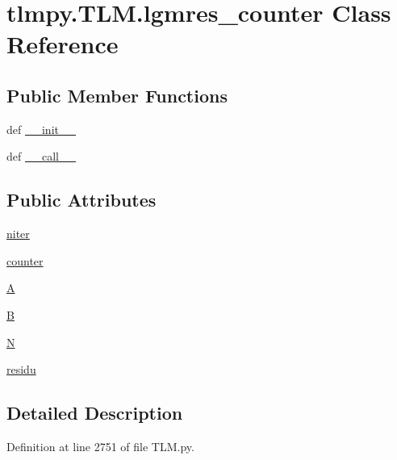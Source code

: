 \hypertarget{classtlmpy_1_1TLM_1_1lgmres__counter}{
\section{tlmpy.TLM.lgmres\_\-counter Class Reference}
\label{classtlmpy_1_1TLM_1_1lgmres__counter}
}
\subsection*{Public Member Functions}
\begin{DoxyCompactItemize}
\item 
def \hyperlink{classtlmpy_1_1TLM_1_1lgmres__counter_a3445cbd6d607d4b2825854d2ecc30898}{\_\-\_\-init\_\-\_\-}
\item 
def \hyperlink{classtlmpy_1_1TLM_1_1lgmres__counter_ab297b26909720fcbd8fea5479de5c8af}{\_\-\_\-call\_\-\_\-}
\end{DoxyCompactItemize}
\subsection*{Public Attributes}
\begin{DoxyCompactItemize}
\item 
\hyperlink{classtlmpy_1_1TLM_1_1lgmres__counter_aa7e2ef3f6229813fad4053d71b6d556d}{niter}
\item 
\hyperlink{classtlmpy_1_1TLM_1_1lgmres__counter_ab78b79b5eeb81744ad21e3038245c9a8}{counter}
\item 
\hyperlink{classtlmpy_1_1TLM_1_1lgmres__counter_adb46fedc179a74185b3eaae0af1f16d6}{A}
\item 
\hyperlink{classtlmpy_1_1TLM_1_1lgmres__counter_a19b4c7630135a421385765cd996e2f96}{B}
\item 
\hyperlink{classtlmpy_1_1TLM_1_1lgmres__counter_a94a1106a18e51a82626abcea6503979d}{N}
\item 
\hyperlink{classtlmpy_1_1TLM_1_1lgmres__counter_abe12d76f3415a6e1bc658ea54ec7c8d7}{residu}
\end{DoxyCompactItemize}


\subsection{Detailed Description}


Definition at line 2751 of file TLM.py.

